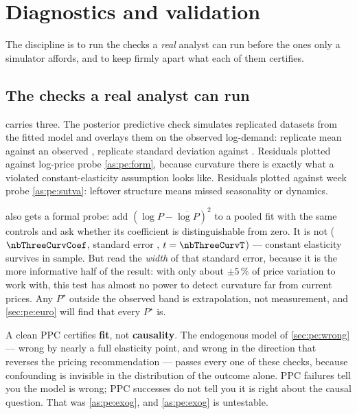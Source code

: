 \section{Diagnostics and validation}
\label{sec:pe:valid}

The discipline is to run the checks a \emph{real} analyst can run before the ones only a simulator
affords, and to keep firmly apart what each of them certifies.

\subsection*{The checks a real analyst can run}

 carries three. The posterior predictive check simulates replicated datasets from
the fitted model and overlays them on the observed log-demand: replicate mean \nbThreePpcMean{}
against an observed \nbThreeObsMean, replicate standard deviation \nbThreePpcSd{} against
\nbThreeObsSd. Residuals plotted against log-price probe \cref{as:pe:form}, because curvature
there is exactly what a violated constant-elasticity assumption looks like. Residuals plotted
against week probe \cref{as:pe:sutva}: leftover structure means missed seasonality or dynamics.



 also gets a formal probe: add $(\log P - \overline{\log P})^2$ to a pooled fit
with the same controls and ask whether its coefficient is distinguishable from zero. It is not
($\nbThreeCurvCoef$, standard error \nbThreeCurvSe, $t = \nbThreeCurvT$) --- constant elasticity
survives in sample. But read the \emph{width} of that standard error, because it is the more
informative half of the result: with only about $\pm 5\,\%$ of price variation to work with, this
test has almost no power to detect curvature far from current prices. Any $P^\star$ outside the
observed band is extrapolation, not measurement, and \cref{sec:pe:euro} will find that every
$P^\star$ is.

\begin{remark}
A clean PPC certifies \textbf{fit}, not \textbf{causality}. The endogenous model of
\cref{sec:pe:wrong} --- wrong by nearly a full elasticity point, and wrong in the direction that
reverses the pricing recommendation --- passes every one of these checks, because confounding is
invisible in the distribution of the outcome alone. PPC failures tell you the model is wrong; PPC
successes do not tell you it is right about the causal question. That was \cref{as:pe:exog}, and
\cref{as:pe:exog} is untestable.
\end{remark}

